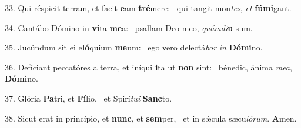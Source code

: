 33. Qui réspicit terram, et facit \textbf{e}am \textbf{tré}mere: \ast\  qui tangit mon\textit{tes}, \textit{et} \textbf{fú}\textbf{mi}gant.\

34. Cantábo Dómino in \textbf{vi}ta \textbf{me}a: \ast\  psallam Deo meo, \textit{quám}\textit{di}\textbf{u} sum.\

35. Jucúndum sit ei e\textbf{ló}quium \textbf{me}um: \ast\  ego vero delectá\textit{bor} \textit{in} \textbf{Dó}\textbf{mi}no.\

36. Defíciant peccatóres a terra, et iníqui \textbf{i}ta ut \textbf{non} sint: \ast\  bénedic, ánima \textit{me}\textit{a}, \textbf{Dó}\textbf{mi}no.\

37. Glória \textbf{Pa}tri, et \textbf{Fí}lio, \ast\  et Spirí\textit{tu}\textit{i} \textbf{Sanc}to.\

38. Sicut erat in princípio, et \textbf{nunc}, et \textbf{sem}per, \ast\  et in sǽcula sæcu\textit{ló}\textit{rum}. \textbf{A}men.\

